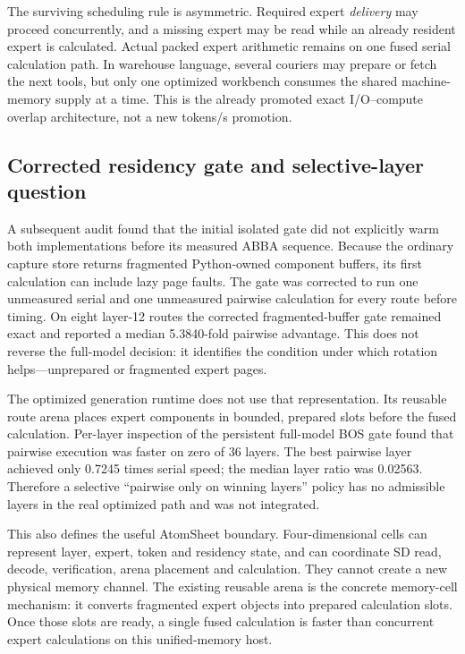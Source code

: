The surviving scheduling rule is asymmetric.  Required expert \emph{delivery}
may proceed concurrently, and a missing expert may be read while an already
resident expert is calculated.  Actual packed expert arithmetic remains on one
fused serial calculation path.  In warehouse language, several couriers may
prepare or fetch the next tools, but only one optimized workbench consumes the
shared machine-memory supply at a time.  This is the already promoted exact
I/O--compute overlap architecture, not a new tokens/s promotion.

\subsection{Corrected residency gate and selective-layer question}

A subsequent audit found that the initial isolated gate did not explicitly
warm both implementations before its measured ABBA sequence.  Because the
ordinary capture store returns fragmented Python-owned component buffers, its
first calculation can include lazy page faults.  The gate was corrected to run
one unmeasured serial and one unmeasured pairwise calculation for every route
before timing.  On eight layer-12 routes the corrected fragmented-buffer gate
remained exact and reported a median 5.3840-fold pairwise advantage.  This does
not reverse the full-model decision: it identifies the condition under which
rotation helps---unprepared or fragmented expert pages.

The optimized generation runtime does not use that representation.  Its
reusable route arena places expert components in bounded, prepared slots before
the fused calculation.  Per-layer inspection of the persistent full-model BOS
gate found that pairwise execution was faster on zero of 36 layers.  The best
pairwise layer achieved only 0.7245 times serial speed; the median layer ratio
was 0.02563.  Therefore a selective ``pairwise only on winning layers'' policy
has no admissible layers in the real optimized path and was not integrated.

This also defines the useful AtomSheet boundary.  Four-dimensional cells can
represent layer, expert, token and residency state, and can coordinate SD read,
decode, verification, arena placement and calculation.  They cannot create a
new physical memory channel.  The existing reusable arena is the concrete
memory-cell mechanism: it converts fragmented expert objects into prepared
calculation slots.  Once those slots are ready, a single fused calculation is
faster than concurrent expert calculations on this unified-memory host.
